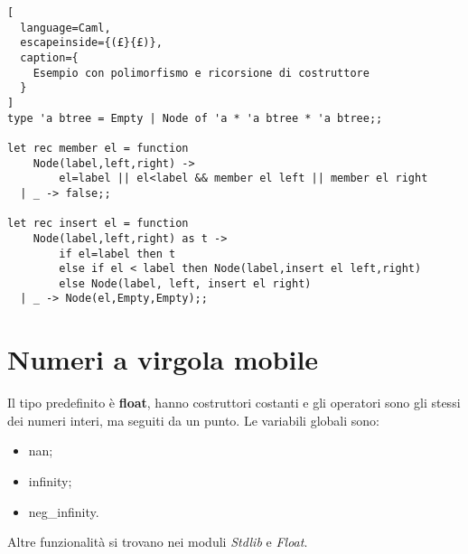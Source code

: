 \begin{lstlisting}[
  language=Caml,
  escapeinside={(£}{£)},
  caption={
    Esempio con polimorfismo e ricorsione di costruttore
  }
]
type 'a btree = Empty | Node of 'a * 'a btree * 'a btree;;

let rec member el = function
    Node(label,left,right) ->
        el=label || el<label && member el left || member el right
  | _ -> false;;

let rec insert el = function
    Node(label,left,right) as t ->
        if el=label then t
        else if el < label then Node(label,insert el left,right)
        else Node(label, left, insert el right)
  | _ -> Node(el,Empty,Empty);;
\end{lstlisting}
\section{Numeri a virgola mobile}
Il tipo predefinito è \textbf{float}, hanno costruttori costanti e gli
operatori sono gli stessi dei numeri interi, ma seguiti da un punto.
Le variabili globali sono:
\begin{itemize}
  \item nan;
  \item infinity;
  \item neg\_infinity.
\end{itemize}
Altre funzionalità si trovano nei moduli \emph{Stdlib} e \emph{Float}.
